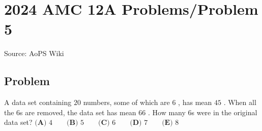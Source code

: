 \documentclass[12pt]{article}
\begin{document}
\section*{{2024 AMC 12A Problems/Problem 5}}
Source: AoPS Wiki

\subsection*{Problem}
A data set containing $20$ numbers, some of which are $6$ , has mean $45$ . When all the 6s are removed, the data set has mean $66$ . How many 6s were in the original data set? $\textbf{(A) }4\qquad\textbf{(B) }5\qquad\textbf{(C) }6\qquad\textbf{(D) }7\qquad\textbf{(E) }8$
\end{document}
